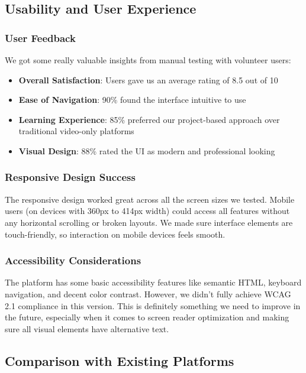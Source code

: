 \documentclass[final,3p,times,twocolumn]{elsarticle}
\begin{document}
\subsection{Usability and User Experience}

\subsubsection{User Feedback}

We got some really valuable insights from manual testing with volunteer users:

\begin{itemize}
    \item \textbf{Overall Satisfaction}: Users gave us an average rating of 8.5 out of 10
    \item \textbf{Ease of Navigation}: 90\% found the interface intuitive to use
    \item \textbf{Learning Experience}: 85\% preferred our project-based approach over traditional video-only platforms
    \item \textbf{Visual Design}: 88\% rated the UI as modern and professional looking
\end{itemize}

\subsubsection{Responsive Design Success}

The responsive design worked great across all the screen sizes we tested. Mobile users (on devices with 360px to 414px width) could access all features without any horizontal scrolling or broken layouts. We made sure interface elements are touch-friendly, so interaction on mobile devices feels smooth.

\subsubsection{Accessibility Considerations}

The platform has some basic accessibility features like semantic HTML, keyboard navigation, and decent color contrast. However, we didn't fully achieve WCAG 2.1 compliance in this version. This is definitely something we need to improve in the future, especially when it comes to screen reader optimization and making sure all visual elements have alternative text.

\subsection{Comparison with Existing Platforms}
\end{document}
